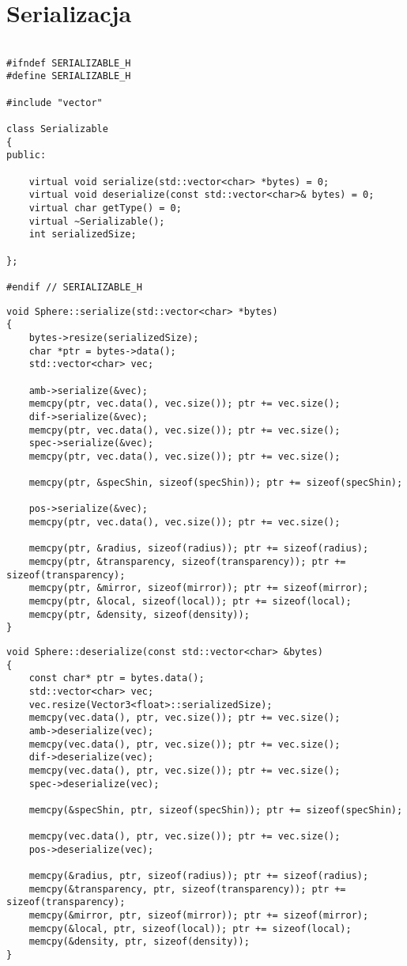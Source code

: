 \section{Serializacja}


\begin{lstlisting}

#ifndef SERIALIZABLE_H
#define SERIALIZABLE_H

#include "vector"

class Serializable
{
public:

    virtual void serialize(std::vector<char> *bytes) = 0;
    virtual void deserialize(const std::vector<char>& bytes) = 0;
    virtual char getType() = 0;
    virtual ~Serializable();
    int serializedSize;

};

#endif // SERIALIZABLE_H

\end{lstlisting}



\begin{lstlisting}
void Sphere::serialize(std::vector<char> *bytes)
{
    bytes->resize(serializedSize);
    char *ptr = bytes->data();
    std::vector<char> vec;

    amb->serialize(&vec);
    memcpy(ptr, vec.data(), vec.size()); ptr += vec.size();
    dif->serialize(&vec);
    memcpy(ptr, vec.data(), vec.size()); ptr += vec.size();
    spec->serialize(&vec);
    memcpy(ptr, vec.data(), vec.size()); ptr += vec.size();

    memcpy(ptr, &specShin, sizeof(specShin)); ptr += sizeof(specShin);

    pos->serialize(&vec);
    memcpy(ptr, vec.data(), vec.size()); ptr += vec.size();

    memcpy(ptr, &radius, sizeof(radius)); ptr += sizeof(radius);
    memcpy(ptr, &transparency, sizeof(transparency)); ptr += sizeof(transparency);
    memcpy(ptr, &mirror, sizeof(mirror)); ptr += sizeof(mirror);
    memcpy(ptr, &local, sizeof(local)); ptr += sizeof(local);
    memcpy(ptr, &density, sizeof(density));
}
\end{lstlisting}


\begin{lstlisting}
void Sphere::deserialize(const std::vector<char> &bytes)
{
    const char* ptr = bytes.data();
    std::vector<char> vec;
    vec.resize(Vector3<float>::serializedSize);
    memcpy(vec.data(), ptr, vec.size()); ptr += vec.size();
    amb->deserialize(vec);
    memcpy(vec.data(), ptr, vec.size()); ptr += vec.size();
    dif->deserialize(vec);
    memcpy(vec.data(), ptr, vec.size()); ptr += vec.size();
    spec->deserialize(vec);

    memcpy(&specShin, ptr, sizeof(specShin)); ptr += sizeof(specShin);

    memcpy(vec.data(), ptr, vec.size()); ptr += vec.size();
    pos->deserialize(vec);

    memcpy(&radius, ptr, sizeof(radius)); ptr += sizeof(radius);
    memcpy(&transparency, ptr, sizeof(transparency)); ptr += sizeof(transparency);
    memcpy(&mirror, ptr, sizeof(mirror)); ptr += sizeof(mirror);
    memcpy(&local, ptr, sizeof(local)); ptr += sizeof(local);
    memcpy(&density, ptr, sizeof(density));
}
\end{lstlisting}